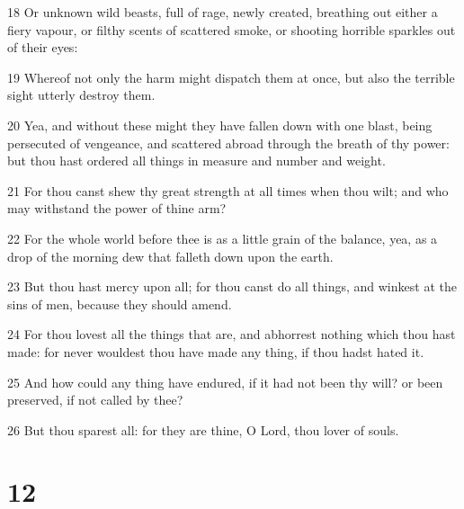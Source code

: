 \par 18 Or unknown wild beasts, full of rage, newly created, breathing out either a fiery vapour, or filthy scents of scattered smoke, or shooting horrible sparkles out of their eyes:
\par 19 Whereof not only the harm might dispatch them at once, but also the terrible sight utterly destroy them.
\par 20 Yea, and without these might they have fallen down with one blast, being persecuted of vengeance, and scattered abroad through the breath of thy power: but thou hast ordered all things in measure and number and weight.
\par 21 For thou canst shew thy great strength at all times when thou wilt; and who may withstand the power of thine arm?
\par 22 For the whole world before thee is as a little grain of the balance, yea, as a drop of the morning dew that falleth down upon the earth.
\par 23 But thou hast mercy upon all; for thou canst do all things, and winkest at the sins of men, because they should amend.
\par 24 For thou lovest all the things that are, and abhorrest nothing which thou hast made: for never wouldest thou have made any thing, if thou hadst hated it.
\par 25 And how could any thing have endured, if it had not been thy will? or been preserved, if not called by thee?
\par 26 But thou sparest all: for they are thine, O Lord, thou lover of souls.

\chapter{12}

